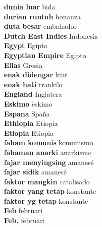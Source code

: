 \textbf{ dunia luar  } bida \\
\textbf{ durian runtuh  } bonanza \\
\textbf{ duta besar  } embahador \\
\textbf{ Dutch East Indies  } Indonesia \\
\textbf{ Egypt  } Egipto \\
\textbf{ Egyptian Empire  } Egipto \\
\textbf{ Ellas  } Gresia \\
\textbf{ enak didengar  } kiut \\
\textbf{ enak hati  } trankilo \\
\textbf{ England  } Inglatera \\
\textbf{ Eskimo  } èskimo \\
\textbf{ Espana  } Spaña \\
\textbf{ Ethiopia  } Etiopia \\
\textbf{ Etiopia  } Etiopia \\
\textbf{ faham komunis  } komunismo \\
\textbf{ fahaman anarki  } anarkismo \\
\textbf{ fajar menyingsing  } amanesé \\
\textbf{ fajar sidik  } amanesé \\
\textbf{ faktor mangkin  } catalisado \\
\textbf{ faktor yang tetap  } konstante \\
\textbf{ faktor yg tetap  } konstante \\
\textbf{ Feb  } febrüari \\
\textbf{ Feb.  } febrüari \\
